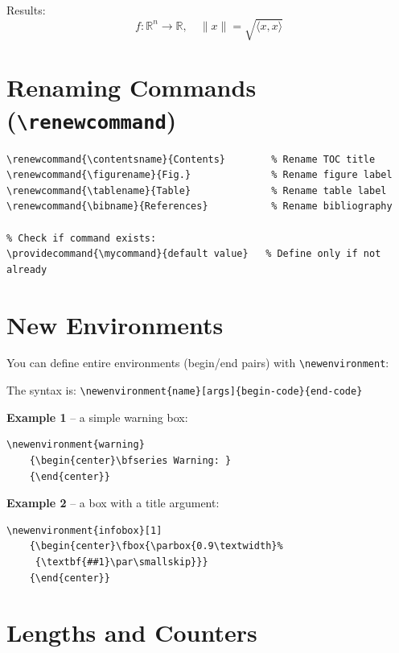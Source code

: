 Results:
\[ f\colon \mathbb{R}^n \to \mathbb{R}, \quad \|x\| = \sqrt{\langle x, x \rangle} \]

\section{Renaming Commands (\texttt{\textbackslash renewcommand})}

\begin{lstlisting}[language={[LaTeX]TeX}, caption=renewcommand]
% Override existing commands:
\renewcommand{\contentsname}{Contents}        % Rename TOC title
\renewcommand{\figurename}{Fig.}              % Rename figure label
\renewcommand{\tablename}{Table}              % Rename table label
\renewcommand{\bibname}{References}           % Rename bibliography

% Check if command exists:
\providecommand{\mycommand}{default value}   % Define only if not already
\end{lstlisting}

\section{New Environments}

You can define entire environments (begin/end pairs) with \verb|\newenvironment|:

The syntax is:
\verb|\newenvironment{name}[args]{begin-code}{end-code}|

\textbf{Example 1} -- a simple warning box:
\begin{lstlisting}[language={[LaTeX]TeX}]
\newenvironment{warning}
    {\begin{center}\bfseries Warning: }
    {\end{center}}
\end{lstlisting}

\textbf{Example 2} -- a box with a title argument:
\begin{lstlisting}[language={[LaTeX]TeX}]
\newenvironment{infobox}[1]
    {\begin{center}\fbox{\parbox{0.9\textwidth}%
     {\textbf{##1}\par\smallskip}}}
    {\end{center}}
\end{lstlisting}

\section{Lengths and Counters}

